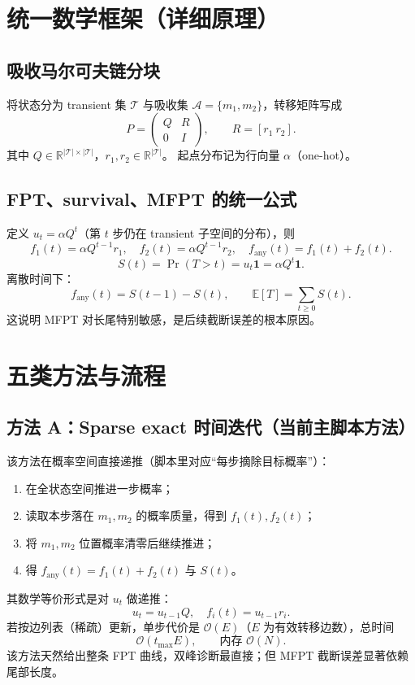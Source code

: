 \documentclass[11pt,a4paper]{ctexart}
\begin{document}
\section{统一数学框架（详细原理）}
\subsection{吸收马尔可夫链分块}
将状态分为 transient 集 $\mathcal T$ 与吸收集 $\mathcal A=\{m_1,m_2\}$，转移矩阵写成
\[
P=
\begin{pmatrix}
Q & R\\
0 & I
\end{pmatrix},\qquad
R=[r_1\ r_2].
\]
其中 $Q\in\mathbb R^{|\mathcal T|\times|\mathcal T|}$，$r_1,r_2\in\mathbb R^{|\mathcal T|}$。
起点分布记为行向量 $\alpha$（one-hot）。

\subsection{FPT、survival、MFPT 的统一公式}
定义 $u_t=\alpha Q^t$（第 $t$ 步仍在 transient 子空间的分布），则
\[
f_1(t)=\alpha Q^{t-1}r_1,\quad
f_2(t)=\alpha Q^{t-1}r_2,\quad
f_{\mathrm{any}}(t)=f_1(t)+f_2(t).
\]
\[
S(t)=\Pr(T>t)=u_t\mathbf 1=\alpha Q^t\mathbf 1.
\]
离散时间下：
\[
f_{\mathrm{any}}(t)=S(t-1)-S(t),\qquad
\mathbb E[T]=\sum_{t\ge 0}S(t).
\]
这说明 MFPT 对长尾特别敏感，是后续截断误差的根本原因。

\section{五类方法与流程}
\subsection{方法 A：Sparse exact 时间迭代（当前主脚本方法）}
该方法在概率空间直接递推（脚本里对应“每步摘除目标概率”）：
\begin{enumerate}[leftmargin=2em]
  \item 在全状态空间推进一步概率；
  \item 读取本步落在 $m_1,m_2$ 的概率质量，得到 $f_1(t),f_2(t)$；
  \item 将 $m_1,m_2$ 位置概率清零后继续推进；
  \item 得 $f_{\mathrm{any}}(t)=f_1(t)+f_2(t)$ 与 $S(t)$。
\end{enumerate}
其数学等价形式是对 $u_t$ 做递推：
\[
u_t=u_{t-1}Q,\quad f_i(t)=u_{t-1}r_i.
\]
若按边列表（稀疏）更新，单步代价是 $\mathcal O(E)$（$E$ 为有效转移边数），总时间
\[
\mathcal O(t_{\max}E),\qquad \text{内存 } \mathcal O(N).
\]
该方法天然给出整条 FPT 曲线，双峰诊断最直接；但 MFPT 截断误差显著依赖尾部长度。
\end{document}
